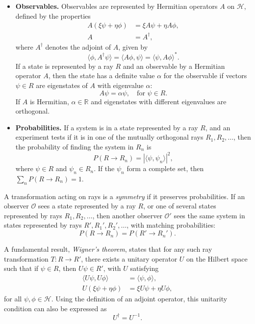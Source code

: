 \begin{itemize}
    \item \textbf{Observables.} Observables are represented by Hermitian operators $A$ on $\mathcal{H}$, defined by the properties
    \begin{subequations}
        \begin{align}
            A(\xi \psi + \eta \phi) &= \xi A \psi + \eta A \phi, \\
            A &= A^\dagger,
        \end{align}
    \end{subequations}
    where $A^\dagger$ denotes the adjoint of $A$, given by
    \[
    \langle \phi, A^\dagger \psi \rangle = \langle A \phi, \psi \rangle = \langle \psi, A \phi \rangle^*.
    \]
    If a state is represented by a ray $R$ and an observable by a Hermitian operator $A$, then the state has a definite value $\alpha$ for the observable if vectors $\psi \in R$ are eigenstates of $A$ with eigenvalue $\alpha$:
    \[
    A \psi = \alpha \psi, \quad \text{for } \psi \in R.
    \]
    If $A$ is Hermitian, $\alpha \in \mathbb{R}$ and eigenstates with different eigenvalues are orthogonal.
    
    \item \textbf{Probabilities.} If a system is in a state represented by a ray $R$, and an experiment tests if it is in one of the mutually orthogonal rays $R_1, R_2, \dots$, then the probability of finding the system in $R_n$ is
    \[
    P(R \to R_n) = |\langle \psi, \psi_n \rangle|^2,
    \]
    where $\psi \in R$ and $\psi_n \in R_n$. If the $\psi_n$ form a complete set, then $\sum_n P(R \to R_n) = 1$.
\end{itemize}

A transformation acting on rays is a \emph{symmetry} if it preserves probabilities. If an observer $\mathcal{O}$ sees a state represented by a ray $R$, or one of several states represented by rays $R_1, R_2, \dots$, then another observer $\mathcal{O}'$ sees the same system in states represented by rays $R', R_1', R_2', \dots$, with matching probabilities:
\[
P(R \to R_n) = P(R' \to R_n').
\]

\noindent
A fundamental result, \emph{Wigner's theorem}, states that for any such ray transformation $T : R \to R'$, there exists a unitary operator $U$ on the Hilbert space such that if $\psi \in R$, then $U \psi \in R'$, with $U$ satisfying
\begin{subequations}
    \begin{align}
        \langle U \psi, U \phi \rangle &= \langle \psi, \phi \rangle, \\
        U(\xi \psi + \eta \phi) &= \xi U \psi + \eta U \phi,
    \end{align}
\end{subequations}
for all $\psi, \phi \in \mathcal{H}$. Using the definition of an adjoint operator, this unitarity condition can also be expressed as
\[
U^\dagger = U^{-1}.
\]

